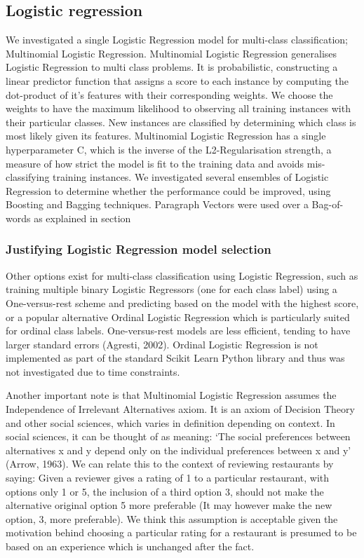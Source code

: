 \documentclass[11pt]{article}
\newcommand{\drafting}[1]{\textcolor{OliveGreen}{#1}}
\begin{document}
\subsection{Logistic regression} \label{subsec:method-lr}
\drafting{
We investigated a single Logistic Regression model for multi-class classification; Multinomial Logistic Regression. Multinomial Logistic Regression generalises Logistic Regression to multi class problems. It is probabilistic, constructing a linear predictor function that assigns a score to each instance by computing the dot-product of it's features with their corresponding weights. We choose the weights to have the maximum likelihood to observing all training instances with their particular classes. New instances are classified by determining which class is most likely given its features.
Multinomial Logistic Regression has a single hyperparameter C, which is the inverse of the L2-Regularisation strength, a measure of how strict the model is fit to the training data and avoids mis-classifying training instances.
We investigated several ensembles of Logistic Regression to determine whether the performance could be improved, using Boosting and Bagging techniques.
Paragraph Vectors were used over a Bag-of-words as explained in section}
\subsubsection*{Justifying Logistic Regression model selection}
\drafting{
Other options exist for multi-class classification using Logistic Regression, such as training multiple binary Logistic Regressors (one for each class label) using a One-versus-rest scheme and predicting based on the model with the highest score, or a popular alternative Ordinal Logistic Regression which is particularly suited for ordinal class labels.
One-versus-rest models are less efficient, tending to have larger standard errors (Agresti, 2002).
Ordinal Logistic Regression is not implemented as part of the standard Scikit Learn Python library and thus was not investigated due to time constraints.
}

\drafting{
Another important note is that Multinomial Logistic Regression assumes the Independence of Irrelevant Alternatives axiom. It is an axiom of Decision Theory and other social sciences, which varies in definition depending on context. In social sciences, it can be thought of as meaning:
`The social preferences between alternatives x and y depend only on the individual preferences between x and y' (Arrow, 1963).
We can relate this to the context of reviewing restaurants by saying:
Given a reviewer gives a rating of 1 to a particular restaurant, with options only 1 or 5, the inclusion of a third option 3, should not make the alternative original option 5 more preferable (It may however make the new option, 3, more preferable).
We think this assumption is acceptable given the motivation behind choosing a particular rating for a restaurant is presumed to be based on an experience which is unchanged after the fact.
}
\end{document}

